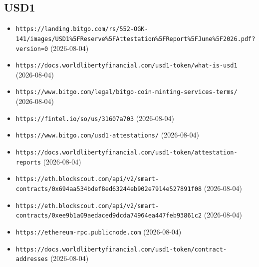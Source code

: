 \subsection*{USD1}
\begin{itemize}\setlength{\itemsep}{0pt}\small
\item \texttt{https://landing.bitgo.com/rs/552-OGK-141/images/USD1\%5FReserve\%5FAttestation\%5FReport\%5FJune\%5F2026.pdf?version=0} (2026-08-04)
\item \texttt{https://docs.worldlibertyfinancial.com/usd1-token/what-is-usd1} (2026-08-04)
\item \texttt{https://www.bitgo.com/legal/bitgo-coin-minting-services-terms/} (2026-08-04)
\item \texttt{https://fintel.io/so/us/31607a703} (2026-08-04)
\item \texttt{https://www.bitgo.com/usd1-attestations/} (2026-08-04)
\item \texttt{https://docs.worldlibertyfinancial.com/usd1-token/attestation-reports} (2026-08-04)
\item \texttt{https://eth.blockscout.com/api/v2/smart-contracts/0x694aa534bdef8ed63244eb902e7914e527891f08} (2026-08-04)
\item \texttt{https://eth.blockscout.com/api/v2/smart-contracts/0xee9b1a09aedaced9dcda74964ea447feb93861c2} (2026-08-04)
\item \texttt{https://ethereum-rpc.publicnode.com} (2026-08-04)
\item \texttt{https://docs.worldlibertyfinancial.com/usd1-token/contract-addresses} (2026-08-04)
\end{itemize}

